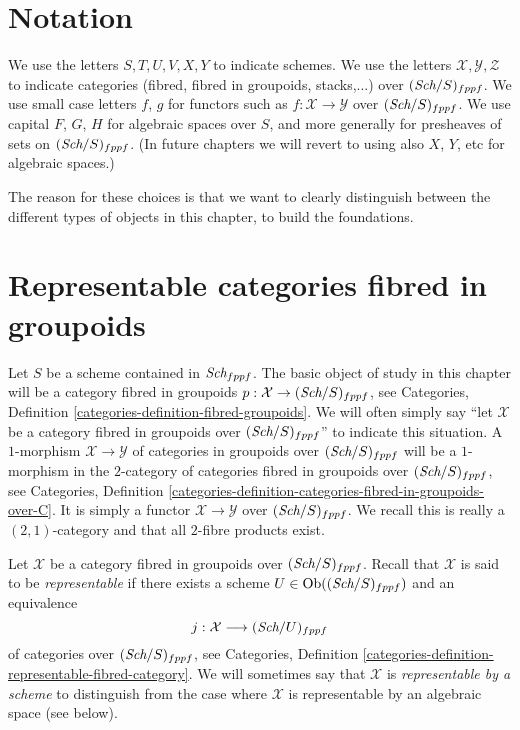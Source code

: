 \section{Notation}
\label{section-notation}

\noindent
We use the letters $S, T, U, V, X, Y$ to indicate schemes.
We use the letters $\mathcal{X}, \mathcal{Y}, \mathcal{Z}$ to indicate
categories (fibred, fibred in groupoids, stacks,...)
over $(\textit{Sch}/S)_{fppf}$. We use small case letters
$f$, $g$ for functors such as $f : \mathcal{X} \to \mathcal{Y}$
over $(\textit{Sch}/S)_{fppf}$.
We use capital $F$, $G$, $H$ for algebraic spaces over $S$, and more
generally for presheaves of sets on $(\textit{Sch}/S)_{fppf}$.
(In future chapters we will revert to using also $X$, $Y$, etc
for algebraic spaces.)

\medskip\noindent
The reason for these choices is that we want to clearly distinguish between
the different types of objects in this chapter, to build the foundations.









\section{Representable categories fibred in groupoids}
\label{section-representable}

\noindent
Let $S$ be a scheme contained in $\textit{Sch}_{fppf}$.
The basic object of study in this chapter will be a
category fibred in groupoids
$p : \mathcal{X} \to (\textit{Sch}/S)_{fppf}$, see
Categories, Definition \ref{categories-definition-fibred-groupoids}.
We will often simply say ``let $\mathcal{X}$ be a category fibred
in groupoids over $(\textit{Sch}/S)_{fppf}$'' to indicate
this situation. A $1$-morphism $\mathcal{X} \to \mathcal{Y}$ of categories
in groupoids over $(\textit{Sch}/S)_{fppf}$ will be a $1$-morphism
in the $2$-category of categories fibred in groupoids over
$(\textit{Sch}/S)_{fppf}$, see
Categories,
Definition \ref{categories-definition-categories-fibred-in-groupoids-over-C}.
It is simply a functor $\mathcal{X} \to \mathcal{Y}$ over
$(\textit{Sch}/S)_{fppf}$.
We recall this is really a $(2, 1)$-category and that all $2$-fibre products
exist.

\medskip\noindent
Let $\mathcal{X}$ be a category fibred in groupoids over
$(\textit{Sch}/S)_{fppf}$. Recall that $\mathcal{X}$
is said to be {\it representable} if there exists a
scheme $U \in \text{Ob}((\textit{Sch}/S)_{fppf})$ and an
equivalence
$$
j : \mathcal{X} \longrightarrow (\textit{Sch}/U)_{fppf}
$$
of categories over $(\textit{Sch}/S)_{fppf}$, see
Categories,
Definition \ref{categories-definition-representable-fibred-category}.
We will sometimes say that $\mathcal{X}$ is
{\it representable by a scheme} to distinguish from the case
where $\mathcal{X}$ is representable by an algebraic space (see
below).

